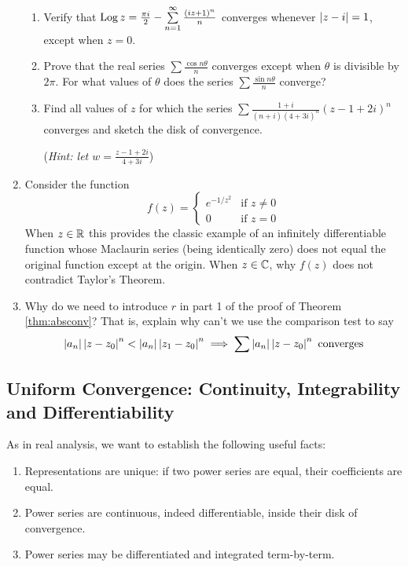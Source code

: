 \begin{exercises*}
\begin{enumerate}
\begin{enumerate}
    \item Verify that $\operatorname{Log} z=\frac{\pi i}2-\sum\limits_{n=1}^\infty \frac{(iz+1)^n}n$ converges whenever $\left| z-i\right|=1$, except when $z=0$.
    
    \item Prove that the real series $\sum\frac{\cos n\theta}n$ converges except when $\theta$ is divisible by $2\pi$. For what values of $\theta$ does the series $\sum\frac{\sin n\theta}n$ converge?
    
    \item Find all values of $z$ for which the series $\sum \frac{1+i}{(n+i)(4+3i)^n}(z-1+2i)^n$ converges and sketch the disk of convergence.\par
    (\emph{Hint: let $w=\frac{z-1+2i}{4+3i}$})
  \end{enumerate}
    
  \item\label{ex:maczero} Consider the function
  \[f(z)=\begin{cases}
  e^{-1/z^2}&\text{if }z\neq 0\\
  0&\text{if }z=0
  \end{cases}\]
  When $z\in\mathbb{R}$ this provides the classic example of an infinitely differentiable function whose Maclaurin series (being identically zero) does not equal the original function except at the origin. When $z\in\mathbb{C}$, why $f(z)$ does not contradict Taylor's Theorem.
  
  \item Why do we need to introduce $r$ in part 1 of the proof of Theorem \ref{thm:absconv}? That is, explain why can't we use the comparison test to say
  \[\left| a_n\right|\left| z-z_0\right|^n<\left| a_n\right|\left| z_1-z_0\right|^n\implies \sum\left| a_n\right|\left| z-z_0\right|^n\text{ converges}\]

\end{enumerate}
\end{exercises*}
\clearpage



\subsection{Uniform Convergence: Continuity, Integrability and Differentiability}\label{sec:unifconv}

As in real analysis, we want to establish the following useful facts:
\begin{enumerate}
  \item Representations are unique: if two power series are equal, their coefficients are equal.
  \item Power series are continuous, indeed differentiable, inside their disk of convergence.
  \item Power series may be differentiated and integrated term-by-term.
\end{enumerate}

